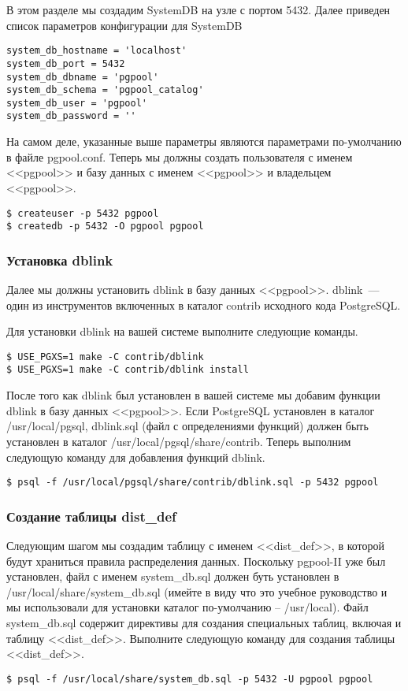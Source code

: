 В этом разделе мы создадим SystemDB на узле с портом 5432. Далее приведен список параметров конфигурации для SystemDB
\begin{verbatim}
system_db_hostname = 'localhost'
system_db_port = 5432
system_db_dbname = 'pgpool'
system_db_schema = 'pgpool_catalog'
system_db_user = 'pgpool'
system_db_password = ''
\end{verbatim}

На самом деле, указанные выше параметры являются параметрами по-умолчанию в файле pgpool.conf. Теперь мы должны 
создать пользователя с именем <<pgpool>> и базу данных с именем <<pgpool>> и владельцем <<pgpool>>.
\begin{verbatim}
$ createuser -p 5432 pgpool
$ createdb -p 5432 -O pgpool pgpool
\end{verbatim}

\subsubsection{Установка dblink}
Далее мы должны установить dblink в базу данных <<pgpool>>. dblink~--- один из инструментов включенных в каталог 
contrib исходного кода PostgreSQL.

Для установки dblink на вашей системе выполните следующие команды.
\begin{verbatim}
$ USE_PGXS=1 make -C contrib/dblink
$ USE_PGXS=1 make -C contrib/dblink install
\end{verbatim}

После того как dblink был установлен в вашей системе мы добавим функции dblink в базу данных <<pgpool>>. Если PostgreSQL 
установлен в каталог /usr/local/pgsql, dblink.sql (файл с определениями функций) должен быть установлен в каталог 
/usr/local/pgsql/share/contrib. Теперь выполним следующую команду для добавления функций dblink.
\begin{verbatim}
$ psql -f /usr/local/pgsql/share/contrib/dblink.sql -p 5432 pgpool
\end{verbatim}

\subsubsection{Создание таблицы dist\_def}
Следующим шагом мы создадим таблицу с именем <<dist\_def>>, в которой будут храниться правила распределения данных. 
Поскольку pgpool-II уже был установлен, файл с именем system\_db.sql должен буть установлен в 
/usr/local/share/system\_db.sql (имейте в виду что это учебное руководство и мы использовали для установки каталог 
по-умолчанию – /usr/local). Файл system\_db.sql содержит директивы для создания специальных таблиц, включая и 
таблицу <<dist\_def>>. Выполните следующую команду для создания таблицы <<dist\_def>>.
\begin{verbatim}
$ psql -f /usr/local/share/system_db.sql -p 5432 -U pgpool pgpool
\end{verbatim}


